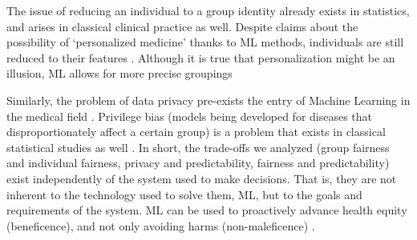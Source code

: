     The issue of reducing an individual to a group identity already exists in statistics, and arises in classical clinical practice as well.
    Despite claims about the possibility of `personalized medicine' thanks to ML methods, individuals are still reduced to their features \cite{Dijkstra2020}.
    Although it is true that personalization might be an illusion, ML allows for more precise groupings

    Similarly, the problem of data privacy pre-exists the entry of Machine Learning in the medical field \cite[p.~346]{Dijkstra2020}.
    Privilege bias (models being developed for diseases that disproportionately affect a certain group) \cite[p.~5]{Rajkomar2018} is a problem that exists in classical statistical studies as well \cite{Jackson2019}.
    In short, the trade-offs we analyzed (group fairness and individual fairness, privacy and predictability, fairness and predictability) exist independently of the system used to make decisions.
    That is, they are not inherent to the technology used to solve them, ML, but to the goals and requirements of the system.
    ML can be used to proactively advance health equity (beneficence), and not only avoiding harms (non-maleficence) \cite[p.~2]{Rajkomar2018}\cite{Mccradden2020}.



